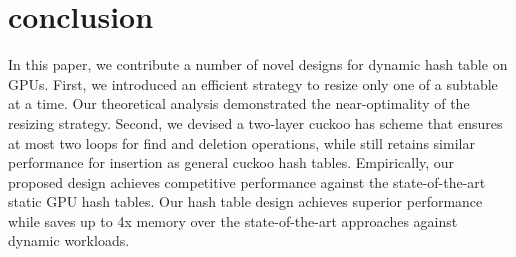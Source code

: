 \section{conclusion}\label{sec:con}
In this paper, we contribute a number of novel designs for dynamic hash table on GPUs. 
First, we introduced an efficient strategy to resize only one of a subtable at a time. Our theoretical analysis demonstrated the near-optimality of the resizing strategy. Second, we devised a two-layer cuckoo has scheme that ensures at most two loops for find and deletion operations, while still retains similar performance for insertion as general cuckoo hash tables. 
Empirically, our proposed design achieves competitive performance against the state-of-the-art static GPU hash tables. Our hash table design achieves superior performance while saves up to 4x memory over the state-of-the-art approaches against dynamic workloads.

 